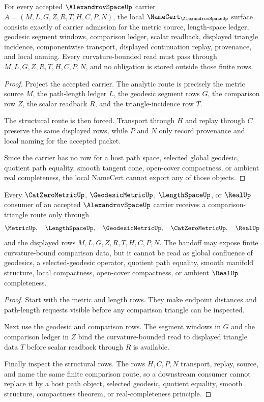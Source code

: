 \begin{theorem}
\label{thm:alexandrov-space-namecert-obligations}
For every accepted $\AlexandrovSpaceUp$ carrier $A=(M,L,G,Z,R,T,H,C,P,N)$, the local $\NameCert_{\AlexandrovSpaceUp}$ surface consists exactly of carrier admission for the metric source, length-space ledger, geodesic segment windows, comparison ledger, scalar readback, displayed triangle incidence, componentwise transport, displayed continuation replay, provenance, and local naming. Every curvature-bounded read must pass through $M,L,G,Z,R,T,H,C,P,N$, and no obligation is stored outside those finite rows.
\end{theorem}
\begin{proof}
Project the accepted carrier. The analytic route is precisely the metric source $M$, the path-length ledger $L$, the geodesic segment rows $G$, the comparison row $Z$, the scalar readback $R$, and the triangle-incidence row $T$.

The structural route is then forced. Transport through $H$ and replay through $C$ preserve the same displayed rows, while $P$ and $N$ only record provenance and local naming for the accepted packet.

Since the carrier has no row for a host path space, selected global geodesic, quotient path equality, smooth tangent cone, open-cover compactness, or ambient real completeness, the local NameCert cannot export any of those objects.
\end{proof}

\begin{theorem}
\label{thm:alexandrov-space-comparison-triangle-scope}
Every $\CatZeroMetricUp$, $\GeodesicMetricUp$, $\LengthSpaceUp$, or $\RealUp$ consumer of an accepted $\AlexandrovSpaceUp$ carrier receives a comparison-triangle route only through
$$
\MetricUp,\quad \LengthSpaceUp,\quad \GeodesicMetricUp,\quad \CatZeroMetricUp,\quad \RealUp
$$
and the displayed rows $M,L,G,Z,R,T,H,C,P,N$. The handoff may expose finite curvature-bound comparison data, but it cannot be read as global confluence of geodesics, a selected-geodesic operator, quotient path equality, smooth manifold structure, local compactness, open-cover compactness, or ambient $\RealUp$ completeness.
\end{theorem}
\begin{proof}
Start with the metric and length rows. They make endpoint distances and path-length requests visible before any comparison triangle can be inspected.

Next use the geodesic and comparison rows. The segment windows in $G$ and the comparison ledger in $Z$ bind the curvature-bounded read to displayed triangle data $T$ before scalar readback through $R$ is available.

Finally inspect the structural rows. The rows $H,C,P,N$ transport, replay, source, and name the same finite comparison route, so a downstream consumer cannot replace it by a host path object, selected geodesic, quotient equality, smooth structure, compactness theorem, or real-completeness principle.
\end{proof}

